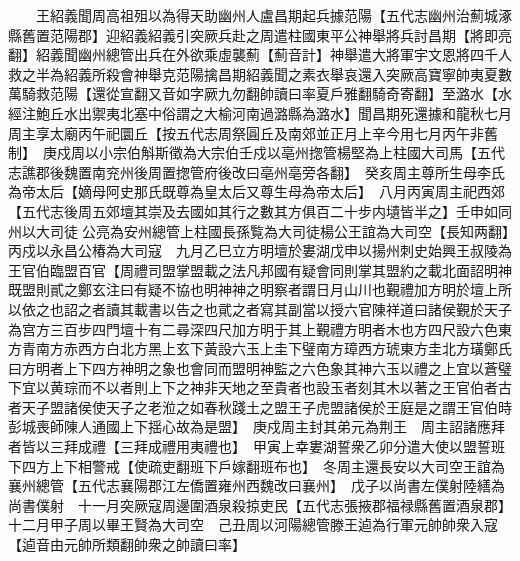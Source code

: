 　　王紹義聞周高祖殂以為得天助幽州人盧昌期起兵據范陽【五代志幽州治薊城涿縣舊置范陽郡】迎紹義紹義引突厥兵赴之周遣柱國東平公神舉將兵討昌期【將即亮翻】紹義聞幽州總管出兵在外欲乘虛襲薊【薊音計】神舉遣大將軍宇文恩將四千人救之半為紹義所殺會神舉克范陽擒昌期紹義聞之素衣舉哀還入突厥高寶寧帥夷夏數萬騎救范陽【還從宣翻又音如字厥九勿翻帥讀曰率夏戶雅翻騎奇寄翻】至潞水【水經注鮑丘水出禦夷北塞中俗謂之大榆河南過潞縣為潞水】聞昌期死還據和龍秋七月周主享太廟丙午祀圜丘【按五代志周祭圓丘及南郊並正月上辛今用七月丙午非舊制】　庚戍周以小宗伯斛斯徵為大宗伯壬戍以亳州揔管楊堅為上柱國大司馬【五代志譙郡後魏置南兖州後周置揔管府後改曰亳州亳旁各翻】　癸亥周主尊所生母李氏為帝太后【嫡母阿史那氏既尊為皇太后又尊生母為帝太后】　八月丙寅周主祀西郊【五代志後周五郊壇其崇及去國如其行之數其方俱百二十步内壝皆半之】壬申如同州以大司徒公亮為安州總管上柱國長孫覧為大司徒楊公王誼為大司空【長知两翻】　丙戍以永昌公椿為大司寇　九月乙巳立方明壇於婁湖戊申以揚州刺史始興王叔陵為王官伯臨盟百官【周禮司盟掌盟載之法凡邦國有疑會同則掌其盟約之載北面詔明神既盟則貳之鄭玄注曰有疑不協也明神神之明察者謂日月山川也覲禮加方明於壇上所以依之也詔之者讀其載書以告之也貮之者寫其副當以授六官陳祥道曰諸侯覲於天子為宫方三百步四門壇十有二尋深四尺加方明于其上覲禮方明者木也方四尺設六色東方青南方赤西方白北方黑上玄下黃設六玉上圭下璧南方璋西方琥東方圭北方璜鄭氏曰方明者上下四方神明之象也會同而盟明神監之六色象其神六玉以禮之上宜以蒼璧下宜以黄琮而不以者則上下之神非天地之至貴者也設玉者刻其木以著之王官伯者古者天子盟諸侯使天子之老涖之如春秋踐土之盟王子虎盟諸侯於王庭是之謂王官伯時彭城喪師陳人通國上下揺心故為是盟】　庚戍周主封其弟元為荆王　周主詔諸應拜者皆以三拜成禮【三拜成禮用夷禮也】　甲寅上幸婁湖誓衆乙卯分遣大使以盟誓班下四方上下相警戒【使疏吏翻班下戶嫁翻班布也】　冬周主還長安以大司空王誼為襄州總管【五代志襄陽郡江左僑置雍州西魏改曰襄州】　戊子以尚書左僕射陸繕為尚書僕射　十一月突厥寇周邊圍酒泉殺掠吏民【五代志張掖郡福禄縣舊置酒泉郡】　十二月甲子周以畢王賢為大司空　己丑周以河陽總管滕王逌為行軍元帥帥衆入寇【逌音由元帥所類翻帥衆之帥讀曰率】

